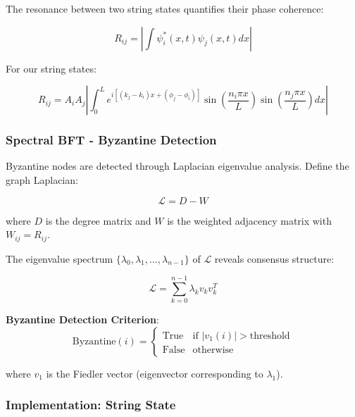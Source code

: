 \documentclass[11pt,a4paper]{article}
\begin{document}
The resonance between two string states quantifies their phase coherence:

\begin{equation}
R_{ij} = \left|\int \psi_i^*(x,t) \psi_j(x,t) dx\right|
\label{eq:resonance-coupling}
\end{equation}

For our string states:

\begin{equation}
R_{ij} = A_i A_j \left|\int_0^L e^{i[(k_j - k_i)x + (\phi_j - \phi_i)]} \sin\left(\frac{n_i\pi x}{L}\right) \sin\left(\frac{n_j\pi x}{L}\right) dx\right|
\end{equation}

\subsubsection{Spectral BFT - Byzantine Detection}

Byzantine nodes are detected through Laplacian eigenvalue analysis. Define the graph Laplacian:

\begin{equation}
\mathcal{L} = D - W
\end{equation}

where $D$ is the degree matrix and $W$ is the weighted adjacency matrix with $W_{ij} = R_{ij}$.

The eigenvalue spectrum $\{\lambda_0, \lambda_1, \ldots, \lambda_{n-1}\}$ of $\mathcal{L}$ reveals consensus structure:

\begin{equation}
\mathcal{L} = \sum_{k=0}^{n-1} \lambda_k v_k v_k^T
\end{equation}

\textbf{Byzantine Detection Criterion}:
\begin{equation}
\text{Byzantine}(i) = \begin{cases}
\text{True} & \text{if } |v_1(i)| > \text{threshold} \\
\text{False} & \text{otherwise}
\end{cases}
\end{equation}

where $v_1$ is the Fiedler vector (eigenvector corresponding to $\lambda_1$).

\subsubsection{Implementation: String State}
\end{document}
